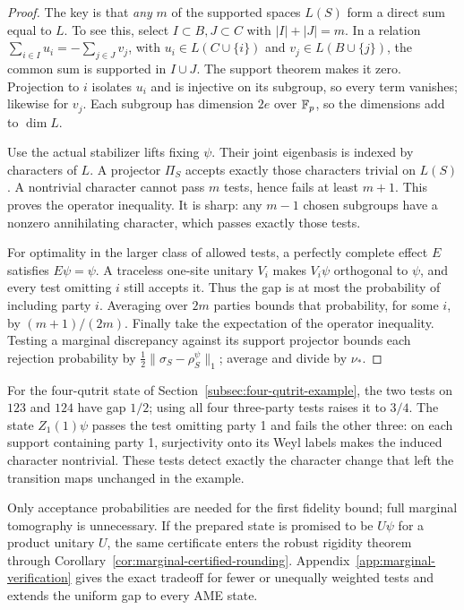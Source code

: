 \begin{proof}
The key is that \emph{any} \(m\) of the supported spaces \(L(S)\)
form a direct sum equal to \(L\).  To see this, select
\(I\subset B,J\subset C\) with \(|I|+|J|=m\).  In a relation
\(\sum_{i\in I}u_i=-\sum_{j\in J}v_j\), with
\(u_i\in L(C\cup\{i\})\) and \(v_j\in L(B\cup\{j\})\), the common
sum is supported in \(I\cup J\).  The support theorem makes it zero.
Projection to \(i\) isolates \(u_i\) and is injective on its subgroup,
so every term vanishes; likewise for \(v_j\).  Each subgroup has dimension
\(2e\) over \(\mathbb F_p\), so the dimensions add to \(\dim L\).

Use the actual stabilizer lifts fixing \(\psi\).  Their joint eigenbasis
is indexed by characters of \(L\).  A projector \(\Pi_S\) accepts
exactly those characters trivial on \(L(S)\).  A nontrivial character
cannot pass \(m\) tests, hence fails at least \(m+1\).  This proves the
operator inequality.  It is sharp: any \(m-1\) chosen subgroups have a
nonzero annihilating character, which passes exactly those tests.

For optimality in the larger class of allowed tests, a perfectly complete
effect \(E\) satisfies \(E\psi=\psi\).  A traceless one-site unitary
\(V_i\) makes \(V_i\psi\) orthogonal to \(\psi\), and every test omitting
\(i\) still accepts it.  Thus the gap is at most the probability of
including party \(i\).  Averaging over \(2m\) parties bounds that
probability, for some \(i\), by \((m+1)/(2m)\).
Finally take the expectation of the operator inequality.  Testing a
marginal discrepancy against its support projector bounds each rejection
probability by \(\tfrac12\|\sigma_S-\rho_S^\psi\|_1\); average and divide
by \(\nu_*\).
\end{proof}

For the four-qutrit state of Section~\ref{subsec:four-qutrit-example},
the two tests on \(123\) and \(124\) have gap \(1/2\); using all four
three-party tests raises it to \(3/4\).  The state
\(Z_1(1)\psi\) passes the test omitting party 1 and fails the other
three: on each support containing party 1, surjectivity onto its Weyl
labels makes the induced character nontrivial.  These tests detect exactly
the character change that left the transition maps unchanged in the example.

Only acceptance probabilities are needed for the first fidelity bound;
full marginal tomography is unnecessary.  If the prepared state is promised
to be \(U\psi\) for a product unitary \(U\), the same certificate enters
the robust rigidity theorem through
Corollary~\ref{cor:marginal-certified-rounding}.
Appendix~\ref{app:marginal-verification} gives the exact tradeoff for fewer
or unequally weighted tests and extends the uniform gap to every AME state.

